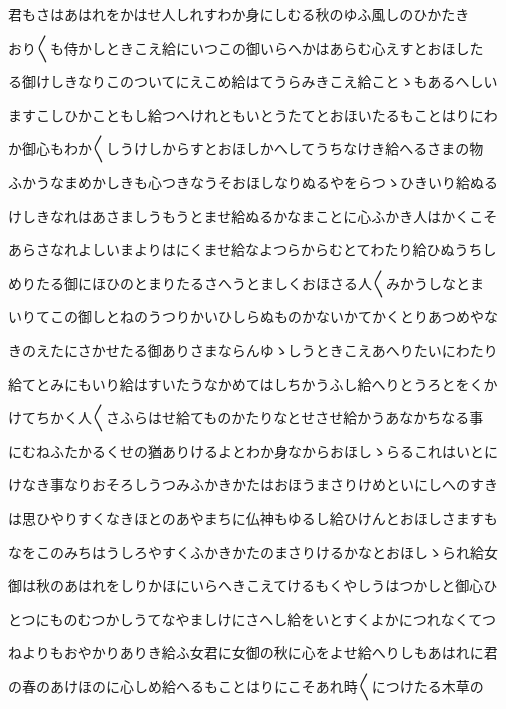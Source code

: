 \documentclass[a4paper,11pt,landscape]{ltjtarticle}
\begin{document}
\par\medskip
君もさはあはれをかはせ人しれすわか身にしむる秋のゆふ風しのひかたき
\par\medskip
おり〱も侍かしときこえ給にいつこの御いらへかはあらむ心えすとおほした
\par\medskip
る御けしきなりこのついてにえこめ給はてうらみきこえ給ことゝもあるへしい
\par\medskip
ますこしひかこともし給つへけれともいとうたてとおほいたるもことはりにわ
\par\medskip
か御心もわか〱しうけしからすとおほしかへしてうちなけき給へるさまの物
\par\medskip
ふかうなまめかしきも心つきなうそおほしなりぬるやをらつゝひきいり給ぬる
\par\medskip
けしきなれはあさましうもうとませ給ぬるかなまことに心ふかき人はかくこそ
\par\medskip
あらさなれよしいまよりはにくませ給なよつらからむとてわたり給ひぬうちし
\par\medskip
めりたる御にほひのとまりたるさへうとましくおほさる人〱みかうしなとま
\par\medskip
いりてこの御しとねのうつりかいひしらぬものかないかてかくとりあつめやな
\par\medskip
きのえたにさかせたる御ありさまならんゆゝしうときこえあへりたいにわたり
\par\medskip
給てとみにもいり給はすいたうなかめてはしちかうふし給へりとうろとをくか
\par\medskip
けてちかく人〱さふらはせ給てものかたりなとせさせ給かうあなかちなる事
\par\medskip
にむねふたかるくせの猶ありけるよとわか身なからおほしゝらるこれはいとに
\par\medskip
けなき事なりおそろしうつみふかきかたはおほうまさりけめといにしへのすき
\par\medskip
は思ひやりすくなきほとのあやまちに仏神もゆるし給ひけんとおほしさますも
\par\medskip
なをこのみちはうしろやすくふかきかたのまさりけるかなとおほしゝられ給女
\par\medskip
御は秋のあはれをしりかほにいらへきこえてけるもくやしうはつかしと御心ひ
\par\medskip
とつにものむつかしうてなやましけにさへし給をいとすくよかにつれなくてつ
\par\medskip
ねよりもおやかりありき給ふ女君に女御の秋に心をよせ給へりしもあはれに君
\par\medskip
の春のあけほのに心しめ給へるもことはりにこそあれ時〱につけたる木草の
\par\medskip
\end{document}
